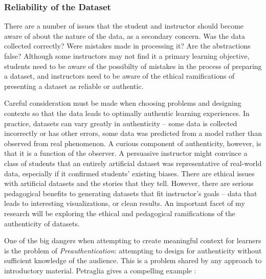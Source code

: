 \subsubsection{Reliability of the Dataset} There are a number of issues that the student and instructor should become aware of about the nature of the data, as a secondary concern. Was the data collected correctly? Were mistakes made in processing it? Are the abstractions false? Although some instructors may not find it a primary learning objective, students need to be aware of the possibilty of mistakes in the process of preparing a dataset, and instructors need to be aware of the ethical ramifications of presenting a dataset as reliable or authentic.
	
Careful consideration must be made when choosing problems and designing contexts so that the data leads to optimally authentic learning experiences.
In practice, datasets can vary greatly in authenticity -- some data is collected incorrectly or has other errors, some data was predicted from a model rather than observed from real phenomenon.
A curious component of authenticity, however, is that it is a function of the observer.
A persuasive instructor might convince a class of students that an entirely artificial dataset was representative of real-world data, especially if it confirmed students' existing biases.
There are ethical issues with artificial datasets and the stories that they tell.
However, there are serious pedagogical benefits to generating datasets that fit instructor's goals -- data that leads to interesting visualizations, or clean results.
An important facet of my research will be exploring the ethical and pedagogical ramifications of the authenticity of datasets.

One of the big dangers when attempting to create meaningful context for learners is the problem of \textit{Preauthentication}: attempting to design for authenticity without sufficient knowledge of the audience. This is a problem shared by any approach to introductory material. Petraglia gives a compelling example \cite{preauthentication}:
	
